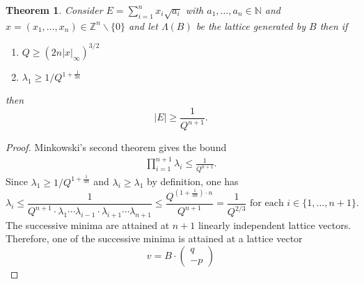 \documentclass[a4paper,11pt,american]{article}
\newcommand{\N}{\mathbb{N}}
\newcommand{\Z}{\mathbb{Z}}
\theoremstyle{plain}
\newtheorem{theorem}{Theorem}
\theoremstyle{definition}
\begin{document}
\begin{theorem}
  \label{thr:9}
Consider $ E = \sum_{i=1}^n x_i \sqrt{a_i}$ with  
$a_1,\dots,a_n\in \N$  and $x = (x_1,\dots,x_n)\in\Z^n\backslash\{0\}$ and let $\Lambda(B)$ be the lattice generated by $B$ then if 
\begin{enumerate}
    \item $Q \geq \left(2 n \vert x\vert _\infty\right)^{3/2}$
    \item $\lambda_1 \geq 1/Q^{1 + \frac{1}{3n}}$
\end{enumerate} then
  \begin{equation*}
    \vert E\vert  \geq \frac{1}{Q^{n+1}}. 
  \end{equation*}
\end{theorem}

\begin{proof}
  Minkowski's second theorem gives the bound 
  \begin{align}\label{eq:minkowski2}
    \prod_{i=1}^{n+1} \lambda_i \leq \frac{1}{Q^{n+1}}.
  \end{align}
 Since   $\lambda_1 \geq 1/Q^{1+\frac{1}{3n}}$ and $\lambda_i\geq \lambda_1$ by definition, one has 
\[ \lambda_{i}  \leq\frac{1}{Q^{n+1}\cdot\lambda_1\cdots\lambda_{i-1}\cdot\lambda_{i+1}\cdots\lambda_{n+1}}\leq\frac{Q^{(1+\frac{1}{3n})\cdot n}}{Q^{n+1}}=\frac{1}{Q^{2/3}} \text{  for each  } i \in\{1,\dots,n+1\}.\]
%
The successive minima are attained at  $n+1$ linearly independent lattice vectors. Therefore,  
one of the successive minima is attained at a lattice vector
\begin{displaymath}
  v =
B \cdot \begin{pmatrix} q \\ -p \end{pmatrix}
\end{displaymath}

\end{proof}
\end{document}
